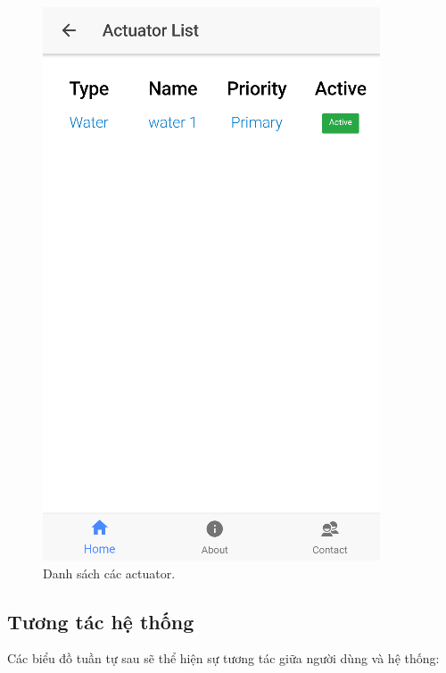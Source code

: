 \documentclass[a4paper,12pt,oneside]{article}
\begin{document}
\begin{figure}[H]
\begin{center}
\includegraphics[scale=.7]{hinh/mobile_actuator_list.png}
\end{center}
\caption{Danh sách các actuator.}
\end{figure}

\subsection{Tương tác hệ thống}
Các biểu đồ tuần tự sau sẽ thể hiện sự tương tác giữa người dùng và hệ thống:
\end{document}
